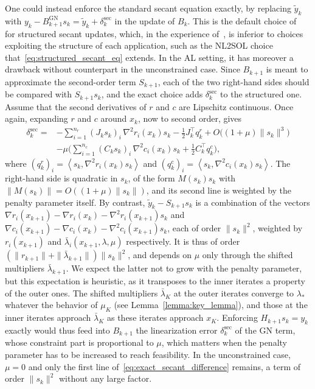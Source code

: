\documentclass[pdflatex,sn-mathphys-num]{sn-jnl}%
\theoremstyle{thmstyleone}%
\newcommand{\inner}[2]{\left\langle {#1} , {#2} \right\rangle} %
\begin{document}
One could instead enforce the standard secant equation exactly, by replacing $\tilde{y}_k$ with $y_k - B^{\mathrm{GN}}_{k+1}s_k = \tilde{y}_k + \delta^{\mathrm{sec}}_k$ in the update of $B_k$. This is the default choice of~\cite{denniswalker:1981} for structured secant updates, which, in the experience of~\cite{dennis-etal:1989}, is inferior to choices exploiting the structure of each application, such as the NL2SOL choice that~\eqref{eq:structured_secant_eq} extends. In the AL setting, it has moreover a drawback without counterpart in the unconstrained case. Since $B_{k+1}$ is meant to approximate the second-order term $S_{k+1}$, each of the two right-hand sides should be compared with $S_{k+1}s_k$, and the exact choice adds $\delta^{\mathrm{sec}}_k$ to the structured one. Assume that the second derivatives of $r$ and $c$ are Lipschitz continuous. Once again, expanding $r$ and $c$ around $x_k$, now to second order, gives
\begin{equation}\label{eq:exact_secant_difference}
	\begin{aligned}
		\delta^{\mathrm{sec}}_k = {}& -\sum_{i=1}^{n_r}(J_ks_k)_i\,\nabla^2 r_i(x_k)s_k - \tfrac{1}{2}J_k^\top q^r_k + O\big((1+\mu)\|s_k\|^3\big)\\
		& -\mu\Big(\sum_{i=1}^{n_c}(C_ks_k)_i\,\nabla^2 c_i(x_k)s_k + \tfrac{1}{2}C_k^\top q^c_k\Big),
	\end{aligned}
\end{equation}
where $(q^r_k)_i = \inner{s_k}{\nabla^2 r_i(x_k)s_k}$ and $(q^c_k)_i = \inner{s_k}{\nabla^2 c_i(x_k)s_k}$. The right-hand side is quadratic in $s_k$, of the form $M(s_k)s_k$ with $\|M(s_k)\| = O((1+\mu)\|s_k\|)$, and its second line is weighted by the penalty parameter itself. By contrast, $\tilde{y}_k - S_{k+1}s_k$ is a combination of the vectors $\nabla r_i(x_{k+1}) - \nabla r_i(x_k) - \nabla^2 r_i(x_{k+1})s_k$ and $\nabla c_i(x_{k+1}) - \nabla c_i(x_k) - \nabla^2 c_i(x_{k+1})s_k$, each of order $\|s_k\|^2$, weighted by $r_i(x_{k+1})$ and $\bar{\lambda}_i(x_{k+1},\lambda,\mu)$ respectively. It is thus of order $(\|r_{k+1}\| + \|\bar{\lambda}_{k+1}\|)\|s_k\|^2$, and depends on $\mu$ only through the shifted multipliers $\bar{\lambda}_{k+1}$. We expect the latter not to grow with the penalty parameter, but this expectation is heuristic, as it transposes to the inner iterates a property of the outer ones. The shifted multipliers $\bar{\lambda}_K$ at the outer iterates converge to $\lambda_*$ whatever the behavior of $\mu_K$ (see Lemma~\ref{lemma:key_lemma}), and those at the inner iterates approach $\bar{\lambda}_K$ as these iterates approach $x_K$. Enforcing $H_{k+1}s_k = y_k$ exactly would thus feed into $B_{k+1}$ the linearization error $\delta^{\mathrm{sec}}_k$ of the GN term, whose constraint part is proportional to $\mu$, which matters when the penalty parameter has to be increased to reach feasibility. In the unconstrained case, $\mu = 0$ and only the first line of~\eqref{eq:exact_secant_difference} remains, a term of order $\|s_k\|^2$ without any large factor.
\end{document}
